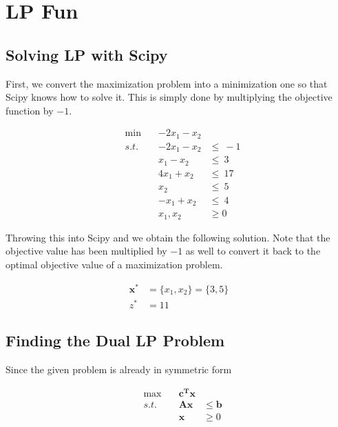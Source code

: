 \chapter{LP Fun}

\section{Solving LP with Scipy}

First, we convert the maximization problem into a minimization one so that Scipy knows how to solve it.
This is simply done by multiplying the objective function by $-1$.

\begin{equation}
    \begin{aligned}
    &\min\quad
        & -2x_1 - x_2 & \\
    &s.t.\quad 
        & -2x_1 -x_2    &\leq\ -1 \\
        && x_1 - x_2     &\leq\ 3 \\
        && 4x_1 + x_2    &\leq\ 17 \\
        && x_2           &\leq\ 5 \\
        && -x_1 + x_2    &\leq\ 4 \\
        && x_1, x_2 &\geq 0
    \end{aligned}
\end{equation}

Throwing this into Scipy and we obtain the following solution. Note that the objective value has been multiplied by $-1$ as well to convert it back to the optimal objective value of a maximization problem.

\begin{equation}
    \begin{aligned}
		\mathbf x^* &= \{x_1, x_2\} = \{3, 5\} \\
		z^* &= 11
    \end{aligned}
\end{equation}

\section{Finding the Dual LP Problem}

Since the given problem is already in symmetric form

\begin{equation}
    \begin{aligned}
	& \max\quad& \mathbf{c^T x} & \\
    & s.t.\quad & \mathbf{Ax} &\leq \mathbf b \\
	&& \mathbf x &\geq 0
    \end{aligned}
\end{equation}

